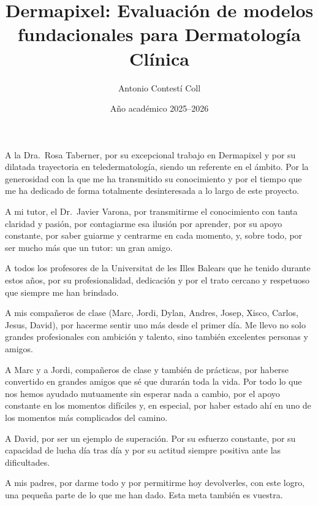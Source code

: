 \documentclass[spanish, GINF]{TFGEPSUIB}
\title{Dermapixel: Evaluación de modelos fundacionales para Dermatología Clínica}
\author{Antonio Contestí Coll}
\date{Año académico 2025--2026}
\begin{document}
\portada
\portadainterior
\frontmatter

\cleartorecto \thispagestyle{empty}
\vspace*{-3cm}
\begin{agraiments}

A la Dra.~Rosa Taberner, por su excepcional trabajo en Dermapixel y por su dilatada trayectoria en teledermatología, siendo un referente en el ámbito. Por la generosidad con la que me ha transmitido su conocimiento y por el tiempo que me ha dedicado de forma totalmente desinteresada a lo largo de este proyecto.

\medskip

A mi tutor, el Dr.\ Javier Varona, por transmitirme el conocimiento con tanta claridad y pasión, por contagiarme esa ilusión por aprender, por su apoyo constante, por saber guiarme y centrarme en cada momento, y, sobre todo, por ser mucho más que un tutor: un gran amigo.

\medskip

A todos los profesores de la Universitat de les Illes Balears que he tenido durante estos años, por su profesionalidad, dedicación y por el trato cercano y respetuoso que siempre me han brindado.

\medskip

A mis compañeros de clase (Marc, Jordi, Dylan, Andres, Josep, Xisco, Carlos, Jesus, David), por hacerme sentir uno más desde el primer día. Me llevo no solo grandes profesionales con ambición y talento, sino también excelentes personas y amigos.

\medskip

A Marc y a Jordi, compañeros de clase y también de prácticas, por haberse convertido en grandes amigos que sé que durarán toda la vida. Por todo lo que nos hemos ayudado mutuamente sin esperar nada a cambio, por el apoyo constante en los momentos difíciles y, en especial, por haber estado ahí en uno de los momentos más complicados del camino.

\medskip

A David, por ser un ejemplo de superación. Por su esfuerzo constante, por su capacidad de lucha día tras día y por su actitud siempre positiva ante las dificultades.

\medskip

A mis padres, por darme todo y por permitirme hoy devolverles, con este logro, una pequeña parte de lo que me han dado. Esta meta también es vuestra.

\medskip


\end{agraiments}
\end{document}
